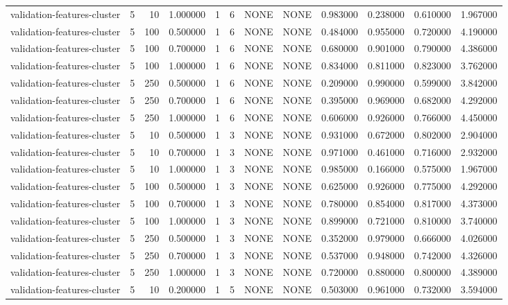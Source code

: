 \begin{tabular}{lrrrllllrrrr}
validation-features-cluster & 5 & 10 & 1.000000 & 1 & 6 & NONE & NONE & 0.983000 & 0.238000 & 0.610000 & 1.967000 \\
validation-features-cluster & 5 & 100 & 0.500000 & 1 & 6 & NONE & NONE & 0.484000 & 0.955000 & 0.720000 & 4.190000 \\
validation-features-cluster & 5 & 100 & 0.700000 & 1 & 6 & NONE & NONE & 0.680000 & 0.901000 & 0.790000 & 4.386000 \\
validation-features-cluster & 5 & 100 & 1.000000 & 1 & 6 & NONE & NONE & 0.834000 & 0.811000 & 0.823000 & 3.762000 \\
validation-features-cluster & 5 & 250 & 0.500000 & 1 & 6 & NONE & NONE & 0.209000 & 0.990000 & 0.599000 & 3.842000 \\
validation-features-cluster & 5 & 250 & 0.700000 & 1 & 6 & NONE & NONE & 0.395000 & 0.969000 & 0.682000 & 4.292000 \\
validation-features-cluster & 5 & 250 & 1.000000 & 1 & 6 & NONE & NONE & 0.606000 & 0.926000 & 0.766000 & 4.450000 \\
validation-features-cluster & 5 & 10 & 0.500000 & 1 & 3 & NONE & NONE & 0.931000 & 0.672000 & 0.802000 & 2.904000 \\
validation-features-cluster & 5 & 10 & 0.700000 & 1 & 3 & NONE & NONE & 0.971000 & 0.461000 & 0.716000 & 2.932000 \\
validation-features-cluster & 5 & 10 & 1.000000 & 1 & 3 & NONE & NONE & 0.985000 & 0.166000 & 0.575000 & 1.967000 \\
validation-features-cluster & 5 & 100 & 0.500000 & 1 & 3 & NONE & NONE & 0.625000 & 0.926000 & 0.775000 & 4.292000 \\
validation-features-cluster & 5 & 100 & 0.700000 & 1 & 3 & NONE & NONE & 0.780000 & 0.854000 & 0.817000 & 4.373000 \\
validation-features-cluster & 5 & 100 & 1.000000 & 1 & 3 & NONE & NONE & 0.899000 & 0.721000 & 0.810000 & 3.740000 \\
validation-features-cluster & 5 & 250 & 0.500000 & 1 & 3 & NONE & NONE & 0.352000 & 0.979000 & 0.666000 & 4.026000 \\
validation-features-cluster & 5 & 250 & 0.700000 & 1 & 3 & NONE & NONE & 0.537000 & 0.948000 & 0.742000 & 4.326000 \\
validation-features-cluster & 5 & 250 & 1.000000 & 1 & 3 & NONE & NONE & 0.720000 & 0.880000 & 0.800000 & 4.389000 \\
validation-features-cluster & 5 & 10 & 0.200000 & 1 & 5 & NONE & NONE & 0.503000 & 0.961000 & 0.732000 & 3.594000 \\

\end{tabular}
